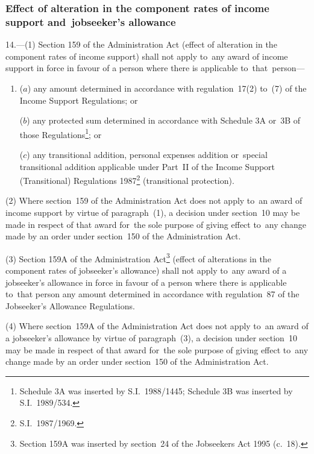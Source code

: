 \documentclass[12pt,a4paper]{article}
\begin{document}

\subsubsection[14. Effect of alteration in the component rates of income support and~jobseeker’s allowance]{\sloppy Effect of alteration in the component rates of income support and~jobseeker’s allowance}

14.—(1) Section 159 of the Administration Act (effect of alteration in the component rates of income support) shall not apply to~any award of income support in force in favour of a person where there is applicable to~that~person—
\begin{enumerate}\item[]
($a$) any amount determined in accordance with regulation~17(2) to~(7) of the Income Support Regulations; or

($b$) any protected sum determined in accordance with Schedule 3A or~3B of those Regulations\footnote{\frenchspacing Schedule 3A was inserted by S.I.~1988/1445; Schedule 3B was inserted by S.I.~1989/534.}; or

($c$) any transitional addition, personal expenses addition or~special transitional addition applicable under Part~II of the Income Support (Transitional) Regulations 1987\footnote{\frenchspacing S.I.~1987/1969.} (transitional protection).
\end{enumerate}

(2) Where section~159 of the Administration Act does not apply to~an award of income support by virtue of paragraph~(1), a decision under section~10 may be made in respect of that award for~the sole purpose of giving effect to~any change made by an order under section~150 of the Administration Act.

(3) Section 159A of the Administration Act\footnote{\frenchspacing Section 159A was inserted by section~24 of the Jobseekers Act 1995 (c.~18).} (effect of alterations in the component rates of jobseeker’s allowance) shall not apply to~any award of a jobseeker’s allowance in force in favour of a person where there is applicable to~that person any amount determined in accordance with regulation~87 of the Jobseeker’s Allowance Regulations.

(4) Where section~159A of the Administration Act does not apply to~an award of a jobseeker’s allowance by virtue of paragraph~(3), a decision under section~10 may be made in respect of that award for~the sole purpose of giving effect to~any change made by an order under section~150 of the Administration Act.
\end{document}
